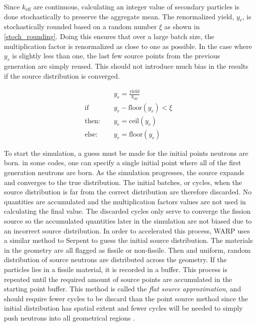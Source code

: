 Since $k_\mathrm{eff}$ are continuous, calculating an integer value of secondary particles is done stochastically to preserve the aggregate mean.  The renormalized yield, $y_r$, is stochastically rounded based on a random number $\xi$ as shown in  \eqref{stoch_rounding}.  Doing this ensures that over a large batch size, the multiplication factor is renormalized as close to one as possible.  In the case where $y_r$ is slightly less than one, the last few source points from the previous generation are simply reused.  This should not introduce much bias in the results if the source distribution is converged.

\begin{equation}
\label{stoch_rounding}
\begin{split}
&y_r = \frac{\mathrm{yield}}{k_\mathrm{eff}} \\
\mathrm{if}\quad &y_r - \mathrm{floor}(y_r)<\xi \\
\mathrm{then:}\quad &y_r=\mathrm{ceil}(y_r) \\
\mathrm{else:}\quad &y_r=\mathrm{floor}(y_r)
\end{split}
\end{equation}

To start the simulation, a guess must be made for the initial points neutrons are born.  in some codes, one can specify a single initial point where all of the first generation neutrons are born.  As the simulation progresses, the source expands and converges to the true distribution.  The initial batches, or cycles, when the source distribution is far from the correct distribution are therefore discarded.  No quantities are accumulated and the multiplication factors values are not used in calculating the final value.  The discarded cycles only serve to converge the fission source so the accumulated quantities later in the simulation are not biased due to an incorrect source distribution.  In order to accelerated this process, WARP uses a similar method to Serpent to guess the initial source distribution.  The materials in the geometry are all flagged as fissile or non-fissile.  Then and uniform, random distribution of source neutrons are distributed across the geometry.  If the particles lies in a fissile material, it is recorded in a buffer.  This process is repeated until the required amount of source points are accumulated in the starting point buffer.  This method is called the \emph{flat source approximation}, and should require fewer cycles to be discard than the point source method since the initial distribution has spatial extent and fewer cycles will be needed to simply push neutrons into all geometrical regions \cite{jaakko}.

